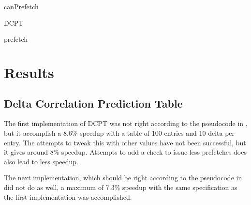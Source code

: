 \documentclass[12pt,journal,compsoc]{IEEEtran}
\begin{document}
\begin{algorithm}[H]
\dontprintsemicolon
{}

\caption{canPrefetch\label{cp}}
\end{algorithm}

\begin{algorithm}[H]
\dontprintsemicolon
{}

\caption{DCPT\label{dcpt}}
\end{algorithm}

\begin{algorithm}[H]
\dontprintsemicolon
{}

\caption{prefetch\label{pre}}
\end{algorithm}


\section{Results}
\subsection{Delta Correlation Prediction Table}
The first implementation of DCPT was not right according to the pseudocode in \cite{dcptpaper}, but it accomplish a 8.6\% speedup with a table of 100 entries and 10 delta per entry.
The attempts to tweak this with other values have not been successful, but it gives around 8\% speedup.
Attempts to add a check to issue less prefetches does also lead to less speedup.

The next implementation, which should be right according to the pseudocode in \cite{dcptpaper} did not do as well, a maximum of 7.3\% speedup with the same specification as the first implementation was accomplished.
\end{document}
